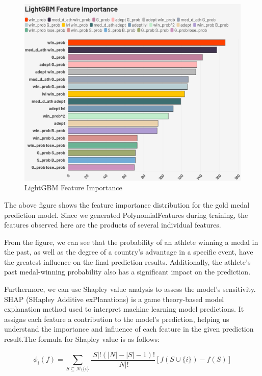 \documentclass[12pt]{article}  %
\begin{document}
\begin{figure}[htbp]
	\centering
	\includegraphics[width=14cm]{img/Sensitive Analysis 1.png}
	\caption{LightGBM Feature Importance}
	\label{fig:aa}
\end{figure}

The above figure shows the feature importance distribution for the gold medal prediction model. Since we generated PolynomialFeatures during training, the features observed here are the products of several individual features.

From the figure, we can see that the probability of an athlete winning a medal in the past, as well as the degree of a country's advantage in a specific event, have the greatest influence on the final prediction results. Additionally, the athlete’s past medal-winning probability also has a significant impact on the prediction.

Furthermore, we can use Shapley value analysis to assess the model's sensitivity. SHAP (SHapley Additive exPlanations) is a game theory-based model explanation method used to interpret machine learning model predictions. It assigns each feature a contribution to the model's prediction, helping us understand the importance and influence of each feature in the given prediction result.The formula for Shapley value is as follows:


\begin{equation}
	\phi_i(f) = \sum_{S \subseteq N \setminus \{i\}} \frac{|S|!(|N|-|S|-1)!}{|N|!} [ f(S \cup \{i\}) - f(S)]
\end{equation}
\end{document}
